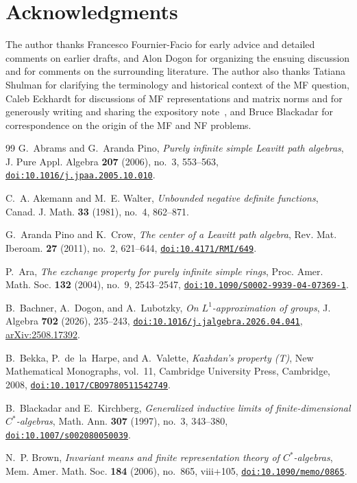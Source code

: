 \documentclass[11pt]{amsart}
\newcommand{\doi}[1]{\href{https://doi.org/#1}{\nolinkurl{doi:#1}}}
\theoremstyle{plain}
\begin{document}
\section*{Acknowledgments}

The author thanks Francesco Fournier-Facio for early advice and detailed
comments on earlier drafts, and Alon Dogon for organizing the ensuing
discussion and for comments on the surrounding literature.  The author also
thanks Tatiana Shulman for clarifying the terminology and historical context
of the MF question, Caleb Eckhardt for discussions of MF representations
and matrix norms and for generously writing and sharing the expository
note~\cite{Eckhardt}, and Bruce Blackadar for correspondence on the
origin of the MF and NF problems.

\begin{thebibliography}{99}
G.~Abrams and G.~Aranda Pino,
\emph{Purely infinite simple Leavitt path algebras},
J. Pure Appl. Algebra \textbf{207} (2006), no.~3, 553--563,
\doi{10.1016/j.jpaa.2005.10.010}.

C.~A. Akemann and M.~E. Walter,
\emph{Unbounded negative definite functions},
Canad. J. Math. \textbf{33} (1981), no.~4, 862--871.

G.~Aranda Pino and K.~Crow,
\emph{The center of a Leavitt path algebra},
Rev. Mat. Iberoam. \textbf{27} (2011), no.~2, 621--644,
\doi{10.4171/RMI/649}.

P.~Ara,
\emph{The exchange property for purely infinite simple rings},
Proc. Amer. Math. Soc. \textbf{132} (2004), no.~9, 2543--2547,
\doi{10.1090/S0002-9939-04-07369-1}.

B.~Bachner, A.~Dogon, and A.~Lubotzky,
\emph{On $L^1$-approximation of groups},
J. Algebra \textbf{702} (2026), 235--243,
\doi{10.1016/j.jalgebra.2026.04.041},
\href{https://arxiv.org/abs/2508.17392}{arXiv:2508.17392}.

B.~Bekka, P.~de~la~Harpe, and A.~Valette,
\emph{Kazhdan's property \textup{(T)}},
New Mathematical Monographs, vol.~11,
Cambridge University Press, Cambridge, 2008,
\doi{10.1017/CBO9780511542749}.

B.~Blackadar and E.~Kirchberg,
\emph{Generalized inductive limits of finite-dimensional $C^*$-algebras},
Math. Ann. \textbf{307} (1997), no.~3, 343--380,
\doi{10.1007/s002080050039}.

N.~P. Brown,
\emph{Invariant means and finite representation theory of $C^*$-algebras},
Mem. Amer. Math. Soc. \textbf{184} (2006), no.~865, viii+105,
\doi{10.1090/memo/0865}.


\end{thebibliography}
\end{document}

